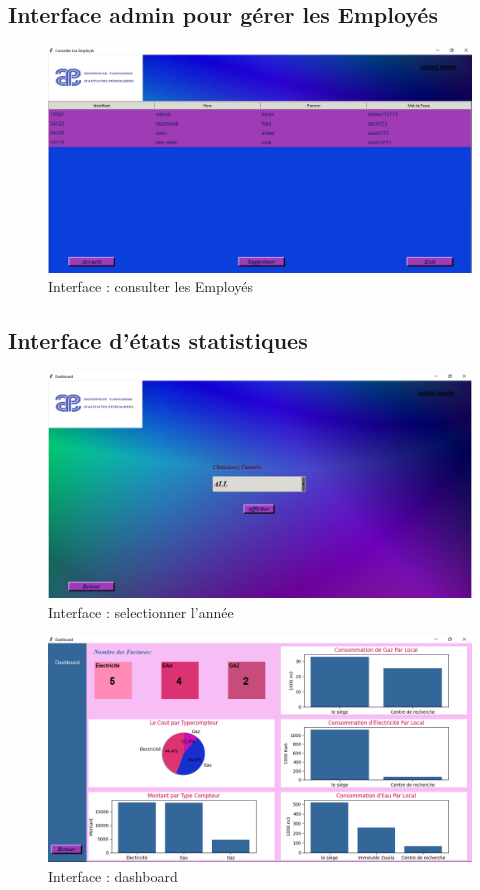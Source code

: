 \documentclass[12pt]{report}
\begin{document}
\subsection{Interface admin pour gérer les Employés}
\begin{figure}[H]
  \centering
  \includegraphics[scale=0.47]{get_user}
  \caption{Interface : consulter les Employés}
  \label{fig:votre-label}
\end{figure}
\subsection{Interface d'états statistiques }
\begin{figure}[H]
  \centering
  \includegraphics[scale=0.47]{dash1}
  \caption{Interface : selectionner l'année}
  \label{fig:votre-label}
\end{figure}
\begin{figure}[H]
  \centering
  \includegraphics[scale=0.47]{dash2}
  \caption{Interface : dashboard}
  \label{fig:votre-label}
\end{figure}
\end{document}
